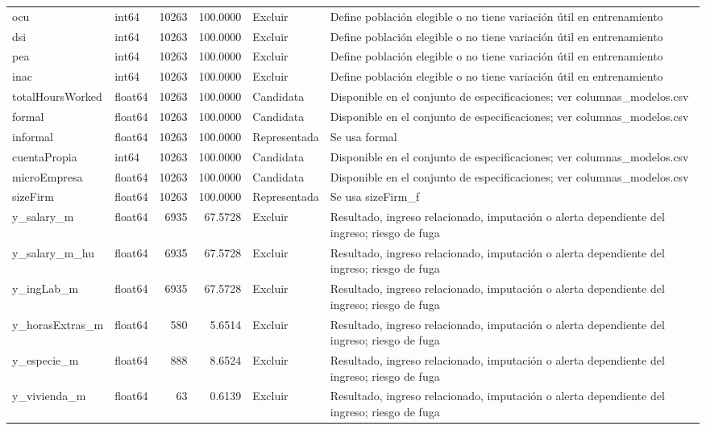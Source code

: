 \begin{longtable}{llrrll}
ocu & int64 & 10263 & 100.0000 & Excluir & Define población elegible o no tiene variación útil en entrenamiento \\
dsi & int64 & 10263 & 100.0000 & Excluir & Define población elegible o no tiene variación útil en entrenamiento \\
pea & int64 & 10263 & 100.0000 & Excluir & Define población elegible o no tiene variación útil en entrenamiento \\
inac & int64 & 10263 & 100.0000 & Excluir & Define población elegible o no tiene variación útil en entrenamiento \\
totalHoursWorked & float64 & 10263 & 100.0000 & Candidata & Disponible en el conjunto de especificaciones; ver columnas\_modelos.csv \\
formal & float64 & 10263 & 100.0000 & Candidata & Disponible en el conjunto de especificaciones; ver columnas\_modelos.csv \\
informal & float64 & 10263 & 100.0000 & Representada & Se usa formal \\
cuentaPropia & int64 & 10263 & 100.0000 & Candidata & Disponible en el conjunto de especificaciones; ver columnas\_modelos.csv \\
microEmpresa & float64 & 10263 & 100.0000 & Candidata & Disponible en el conjunto de especificaciones; ver columnas\_modelos.csv \\
sizeFirm & float64 & 10263 & 100.0000 & Representada & Se usa sizeFirm\_f \\
y\_salary\_m & float64 & 6935 & 67.5728 & Excluir & Resultado, ingreso relacionado, imputación o alerta dependiente del ingreso; riesgo de fuga \\
y\_salary\_m\_hu & float64 & 6935 & 67.5728 & Excluir & Resultado, ingreso relacionado, imputación o alerta dependiente del ingreso; riesgo de fuga \\
y\_ingLab\_m & float64 & 6935 & 67.5728 & Excluir & Resultado, ingreso relacionado, imputación o alerta dependiente del ingreso; riesgo de fuga \\
y\_horasExtras\_m & float64 & 580 & 5.6514 & Excluir & Resultado, ingreso relacionado, imputación o alerta dependiente del ingreso; riesgo de fuga \\
y\_especie\_m & float64 & 888 & 8.6524 & Excluir & Resultado, ingreso relacionado, imputación o alerta dependiente del ingreso; riesgo de fuga \\
y\_vivienda\_m & float64 & 63 & 0.6139 & Excluir & Resultado, ingreso relacionado, imputación o alerta dependiente del ingreso; riesgo de fuga \\

\end{longtable}
